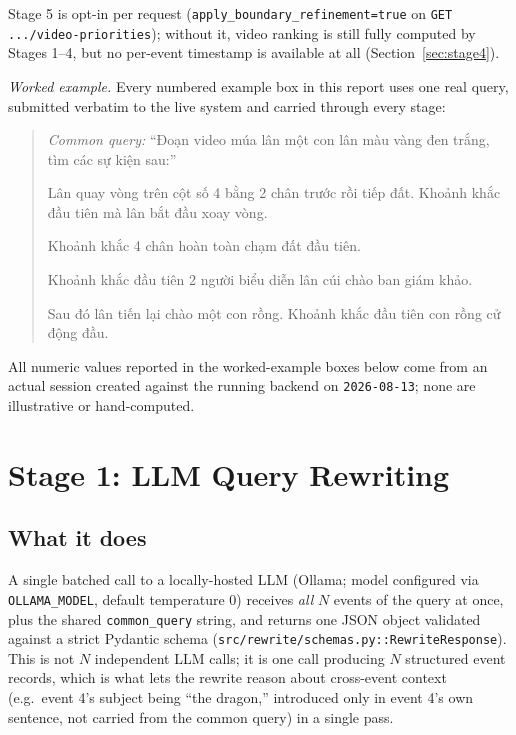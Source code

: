 \documentclass[11pt]{article}
\newcommand{\code}[1]{\texttt{\small #1}}
\newcommand{\file}[1]{\texttt{\footnotesize #1}}
\begin{document}
Stage 5 is opt-in per request (\code{apply\_boundary\_refinement=true} on
\code{GET .../video-priorities}); without it, video ranking is still fully
computed by Stages 1--4, but no per-event timestamp is available at all
(Section~\ref{sec:stage4}).

\emph{Worked example.} Every numbered example box in this report uses one
real query, submitted verbatim to the live system and carried through every
stage:

\begin{quote}
\small
\textit{Common query:} ``Đoạn video múa lân một con lân màu vàng đen trắng,
tìm các sự kiện sau:''
\begin{description}[leftmargin=1.4em,style=nextline]
\item[$E_1$] Lân quay vòng trên cột số 4 bằng 2 chân trước rồi tiếp đất.
  Khoảnh khắc đầu tiên mà lân bắt đầu xoay vòng.
\item[$E_2$] Khoảnh khắc 4 chân hoàn toàn chạm đất đầu tiên.
\item[$E_3$] Khoảnh khắc đầu tiên 2 người biểu diễn lân cúi chào ban giám khảo.
\item[$E_4$] Sau đó lân tiến lại chào một con rồng. Khoảnh khắc đầu tiên con
  rồng cử động đầu.
\end{description}
\end{quote}

\noindent All numeric values reported in the worked-example boxes below come
from an actual session created against the running backend on
\texttt{2026-08-13}; none are illustrative or hand-computed.

\section{Stage 1: LLM Query Rewriting}
\label{sec:stage1}

\subsection{What it does}
A single batched call to a locally-hosted LLM (Ollama; model configured via
\code{OLLAMA\_MODEL}, default temperature 0) receives \emph{all} $N$ events
of the query at once, plus the shared \code{common\_query} string, and
returns one JSON object validated against a strict Pydantic schema
(\file{src/rewrite/schemas.py::RewriteResponse}). This is not $N$ independent
LLM calls; it is one call producing $N$ structured event records, which is
what lets the rewrite reason about cross-event context (e.g.\ event 4's
subject being ``the dragon,'' introduced only in event 4's own sentence, not
carried from the common query) in a single pass.
\end{document}
